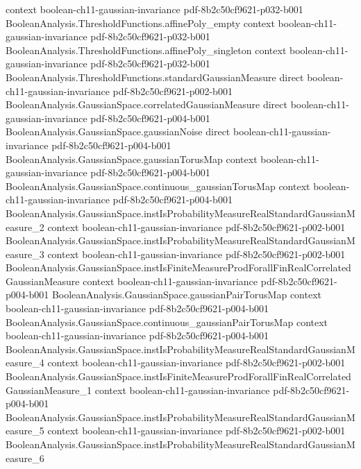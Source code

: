 \begin{theorem}
  {context}
  {boolean-ch11-gaussian-invariance}
  {pdf-8b2c50cf9621-p032-b001}
\proofstep
  {BooleanAnalysis.ThresholdFunctions.affinePoly_empty}
  {context}
  {boolean-ch11-gaussian-invariance}
  {pdf-8b2c50cf9621-p032-b001}
\proofstep
  {BooleanAnalysis.ThresholdFunctions.affinePoly_singleton}
  {context}
  {boolean-ch11-gaussian-invariance}
  {pdf-8b2c50cf9621-p032-b001}
\proofstep
  {BooleanAnalysis.ThresholdFunctions.standardGaussianMeasure}
  {direct}
  {boolean-ch11-gaussian-invariance}
  {pdf-8b2c50cf9621-p002-b001}
\proofstep
  {BooleanAnalysis.GaussianSpace.correlatedGaussianMeasure}
  {direct}
  {boolean-ch11-gaussian-invariance}
  {pdf-8b2c50cf9621-p004-b001}
\proofstep
  {BooleanAnalysis.GaussianSpace.gaussianNoise}
  {direct}
  {boolean-ch11-gaussian-invariance}
  {pdf-8b2c50cf9621-p004-b001}
\proofstep
  {BooleanAnalysis.GaussianSpace.gaussianTorusMap}
  {context}
  {boolean-ch11-gaussian-invariance}
  {pdf-8b2c50cf9621-p004-b001}
\proofstep
  {BooleanAnalysis.GaussianSpace.continuous_gaussianTorusMap}
  {context}
  {boolean-ch11-gaussian-invariance}
  {pdf-8b2c50cf9621-p004-b001}
\proofstep
  {BooleanAnalysis.GaussianSpace.instIsProbabilityMeasureRealStandardGaussianMeasure_2}
  {context}
  {boolean-ch11-gaussian-invariance}
  {pdf-8b2c50cf9621-p002-b001}
\proofstep
  {BooleanAnalysis.GaussianSpace.instIsProbabilityMeasureRealStandardGaussianMeasure_3}
  {context}
  {boolean-ch11-gaussian-invariance}
  {pdf-8b2c50cf9621-p002-b001}
\proofstep
  {BooleanAnalysis.GaussianSpace.instIsFiniteMeasureProdForallFinRealCorrelatedGaussianMeasure}
  {context}
  {boolean-ch11-gaussian-invariance}
  {pdf-8b2c50cf9621-p004-b001}
\proofstep
  {BooleanAnalysis.GaussianSpace.gaussianPairTorusMap}
  {context}
  {boolean-ch11-gaussian-invariance}
  {pdf-8b2c50cf9621-p004-b001}
\proofstep
  {BooleanAnalysis.GaussianSpace.continuous_gaussianPairTorusMap}
  {context}
  {boolean-ch11-gaussian-invariance}
  {pdf-8b2c50cf9621-p004-b001}
\proofstep
  {BooleanAnalysis.GaussianSpace.instIsProbabilityMeasureRealStandardGaussianMeasure_4}
  {context}
  {boolean-ch11-gaussian-invariance}
  {pdf-8b2c50cf9621-p002-b001}
\proofstep
  {BooleanAnalysis.GaussianSpace.instIsFiniteMeasureProdForallFinRealCorrelatedGaussianMeasure_1}
  {context}
  {boolean-ch11-gaussian-invariance}
  {pdf-8b2c50cf9621-p004-b001}
\proofstep
  {BooleanAnalysis.GaussianSpace.instIsProbabilityMeasureRealStandardGaussianMeasure_5}
  {context}
  {boolean-ch11-gaussian-invariance}
  {pdf-8b2c50cf9621-p002-b001}
\proofstep
  {BooleanAnalysis.GaussianSpace.instIsProbabilityMeasureRealStandardGaussianMeasure_6}

\end{theorem}
